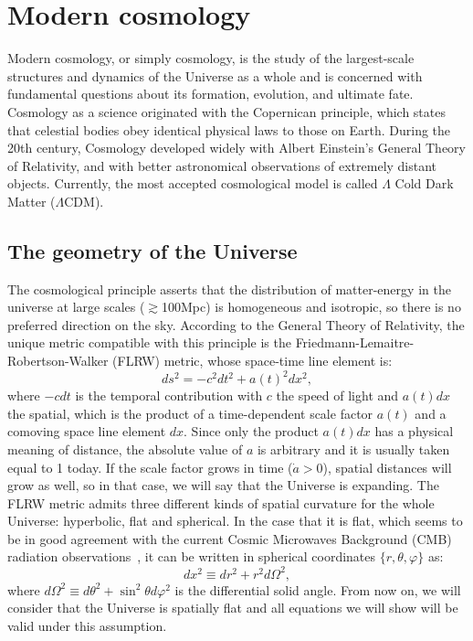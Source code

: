 \section{Modern cosmology}
\label{sec:cosmo_model}

Modern cosmology, or simply cosmology, is the study of the largest-scale structures and dynamics of the Universe as a whole and is concerned with fundamental questions about its formation, evolution, and ultimate fate. Cosmology as a science originated with the Copernican principle, which states that celestial bodies obey identical physical laws to those on Earth. During the 20th century, Cosmology developed widely with Albert Einstein's General Theory of Relativity, and with better astronomical observations of extremely distant objects. Currently, the most accepted cosmological model is called $\Lambda$ Cold Dark Matter ($\Lambda$CDM).

\subsection{The geometry of the Universe}
The cosmological principle asserts that the distribution of matter-energy in the universe at large scales ($\gtrsim$100Mpc) is homogeneous and isotropic, so there is no preferred direction on the sky. According to the General Theory of Relativity, the unique metric compatible with this principle is the Friedmann-Lemaitre-Robertson-Walker (FLRW) metric, whose space-time line element is:  
\begin{equation}
ds^2 = -c^2dt^2 + a(t)^2dx^2,
\label{eq:space-time_line}
\end{equation}
where $-cdt$ is the temporal contribution with $c$ the speed of light and $a(t)dx$ the spatial, which is the product of a time-dependent scale factor $a(t)$ and a comoving space line element $dx$. Since only the product $a(t)dx$ has a physical meaning of distance, the absolute value of $a$ is arbitrary and it is usually taken equal to 1 today. If the scale factor grows in time ($\dot{a}>0$), spatial distances will grow as well, so in that case, we will say that the Universe is expanding. The FLRW metric admits three different kinds of spatial curvature for the whole Universe: hyperbolic, flat and spherical. In the case that it is flat, which seems to be in good agreement with the current Cosmic Microwaves Background (CMB) radiation observations~\citep{komatsu2009, Ade2013}, it can be written in spherical coordinates $\lbrace r, \theta, \varphi \rbrace$ as:
\begin{equation}
dx^2 \equiv dr^2 + r^2d\Omega^2,
\end{equation}
where $d\Omega^2 \equiv d\theta^2 + \sin^2\theta d\varphi^2$ is the differential solid angle. From now on, we will consider that the Universe is spatially flat and all equations we will show will be valid under this assumption.

